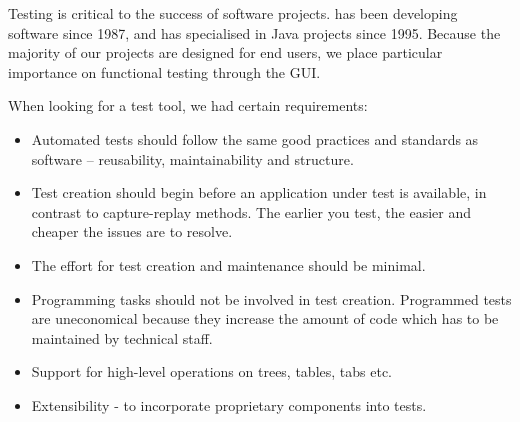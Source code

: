 
Testing is critical to the success of software projects. \bredex has been developing software since 1987, and has specialised in Java projects since 1995. Because the majority of our projects are designed for end users, we place particular importance on functional testing through the GUI.

When looking for a test tool, we had certain requirements:

\begin{itemize}
\item  Automated tests should follow the same good practices and standards as software -- reusability, maintainability and structure.
\item Test creation should begin before an application under test is available, in contrast to capture-replay methods. The earlier you test, the easier and cheaper the issues are to resolve.
\item The effort for test creation and maintenance should be minimal.
\item Programming tasks should not be involved in test creation. Programmed tests are uneconomical because they increase the amount of code which has to be maintained by technical staff.
\item  Support for high-level operations on trees, tables, tabs etc.
\item Extensibility - to incorporate proprietary components into tests.
\end{itemize}




